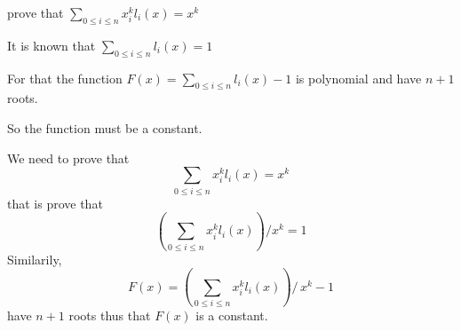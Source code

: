 \documentclass{article}
\begin{document}
prove that 
\( \displaystyle \sum_{ 0 \le i \le n }  x _{i} ^{k} l _{i} (x) = x ^{k}\)

It is known that \( \displaystyle \sum_{   0 \le i \le n }   l _{i} (x)  =  1\)

For that the function \( \displaystyle  F (x)  = \sum_{   0  \le i \le n }  l _{i}  (x)  -  1\) is polynomial and 
have \(n + 1 \) roots. 

So the function must be a constant. 



We need to prove that 
\[
	\sum_{ 0 \le i \le n} x _{i} ^{k} l_{i} (x) = x ^{k} 
\]
that is prove that 
\[
	\left(\sum _{0 \le i \le n } x _{i} ^{k }  l _{i} (x)  \right) \Big/ x ^{k} = 1 
\]
Similarily, 
\[
	F (x) = \left( \sum _{0 \le i \le n}  x _{i} ^{k} l _{i} (x) \right)\!\! \Bigg/\, x ^{k}   - 1 
\]
have \(  n  + 1\) roots thus that  \(F (x) \) is a constant. 
\end{document}

